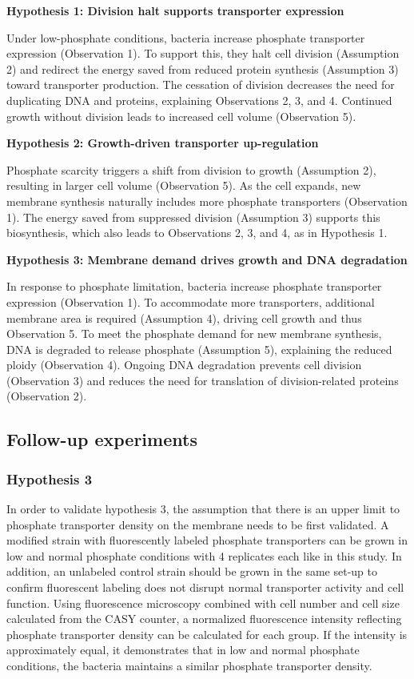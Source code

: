\textbf{Hypothesis 1: Division halt supports transporter expression}

Under low-phosphate conditions, bacteria increase phosphate transporter
expression (Observation 1). To support this, they halt cell division
(Assumption 2) and redirect the energy saved from reduced protein
synthesis (Assumption 3) toward transporter production. The cessation of
division decreases the need for duplicating DNA and proteins, explaining
Observations 2, 3, and 4. Continued growth without division leads to
increased cell volume (Observation 5).

\textbf{Hypothesis 2: Growth-driven transporter up-regulation}

Phosphate scarcity triggers a shift from division to growth (Assumption
2), resulting in larger cell volume (Observation 5). As the cell
expands, new membrane synthesis naturally includes more phosphate
transporters (Observation 1). The energy saved from suppressed division
(Assumption 3) supports this biosynthesis, which also leads to
Observations 2, 3, and 4, as in Hypothesis 1.

\textbf{Hypothesis 3: Membrane demand drives growth and DNA degradation}

In response to phosphate limitation, bacteria increase phosphate
transporter expression (Observation 1). To accommodate more
transporters, additional membrane area is required (Assumption 4),
driving cell growth and thus Observation 5. To meet the phosphate demand
for new membrane synthesis, DNA is degraded to release phosphate
(Assumption 5), explaining the reduced ploidy (Observation 4). Ongoing
DNA degradation prevents cell division (Observation 3) and reduces the
need for translation of division-related proteins (Observation 2).

\subsection{Follow-up experiments}\label{follow-up-experiments}

\subsubsection{Hypothesis 3}\label{hypothesis-3}

In order to validate hypothesis 3, the assumption that there is an upper
limit to phosphate transporter density on the membrane needs to be first
validated. A modified strain with fluorescently labeled phosphate
transporters can be grown in low and normal phosphate conditions with 4
replicates each like in this study. In addition, an unlabeled control
strain should be grown in the same set-up to confirm fluorescent
labeling does not disrupt normal transporter activity and cell function.
Using fluorescence microscopy combined with cell number and cell size
calculated from the CASY counter, a normalized fluorescence intensity
reflecting phosphate transporter density can be calculated for each
group. If the intensity is approximately equal, it demonstrates that in
low and normal phosphate conditions, the bacteria maintains a similar
phosphate transporter density.

